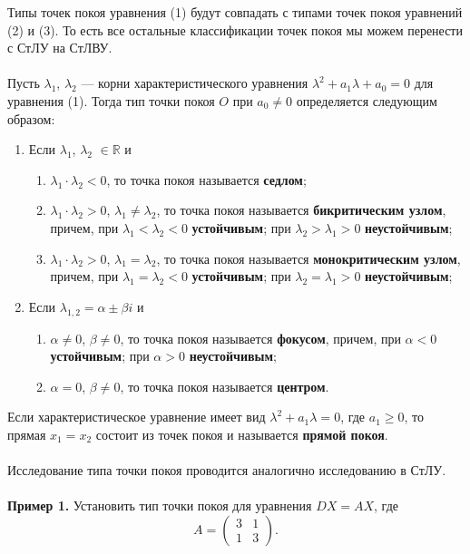 \documentclass[a4paper, 12pt]{article}
\newcommand{\Rm}{\mathbb{R}}
\begin{document}
	Типы точек покоя уравнения (1) будут совпадать с типами точек покоя уравнений (2) и (3). То есть все остальные классификации точек покоя мы можем перенести с СтЛУ на СтЛВУ.\\\\ Пусть $\lambda_1$, $\lambda_2$ --- корни характеристического уравнения $\lambda^2 + a_1\lambda + a_0 = 0$ для уравнения (1). Тогда тип точки покоя $O$ при $a_0 \ne 0$ определяется следующим образом:\begin{enumerate}
		\item Если $\lambda_1$, $\lambda_2$ $\in \Rm$ и
		\begin{enumerate}
			\item $\lambda_1\cdot \lambda_2 < 0$, то точка покоя называется \textbf{седлом};
			\item $\lambda_1\cdot \lambda_2 > 0$, $\lambda_1 \ne \lambda_2$, то точка покоя называется \textbf{бикритическим узлом}, причем, при $\lambda_1 < \lambda_2 < 0$ \textbf{устойчивым}; при $\lambda_2 > \lambda_1 > 0$ \textbf{неустойчивым};
			\item $\lambda_1\cdot \lambda_2 > 0$, $\lambda_1 = \lambda_2$, то точка покоя называется \textbf{монокритическим узлом}, причем, при $\lambda_1 = \lambda_2 < 0$ \textbf{устойчивым}; при $\lambda_2 = \lambda_1 > 0$ \textbf{неустойчивым};
		\end{enumerate}
		\item Если $\lambda_{1,2} = \alpha \pm \beta i$ и\begin{enumerate}
			\item $\alpha \ne 0$, $\beta \ne 0$, то точка покоя называется \textbf{фокусом}, причем, при $\alpha < 0$ \textbf{устойчивым}; при $\alpha > 0$ \textbf{неустойчивым};
			\item $\alpha = 0$, $\beta \ne 0$, то точка покоя называется \textbf{центром}.
		\end{enumerate}
	\end{enumerate}
	Если характеристическое уравнение имеет вид $\lambda^2 + a_1\lambda = 0$, где $a_1 \geqslant 0$, то прямая $x_1 = x_2$ состоит из точек покоя и называется \textbf{прямой покоя}.\\\\
	Исследование типа точки покоя проводится аналогично исследованию в СтЛУ.\\\\
	\textbf{Пример 1.} Установить тип точки покоя для уравнения $DX = AX$, где $$A = \begin{pmatrix}
		3 & 1\\
		1 & 3
	\end{pmatrix}.$$
\end{document}
